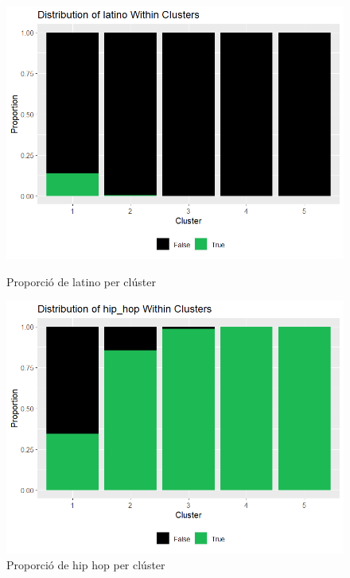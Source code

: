 \begin{figure}[H]
    \centering
    \begin{minipage}{.4\textwidth}
        \centering
        \includegraphics[width=0.95\linewidth]{Images//8_Textual//LSA/profiling_latino.png}
        \caption{Proporció de latino per clúster}
        \label{fig:textual_lsa_profiling_latino}
    \end{minipage}%
    \begin{minipage}{.4\textwidth}
        \centering
        \includegraphics[width=0.95\linewidth]{Images//8_Textual//LSA/profiling_hip_hop.png}
        \caption{Proporció de hip hop per clúster}
        \label{fig:textual_lsa_profiling_hiphop}
    \end{minipage}%
\end{figure}

